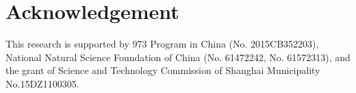 \section*{Acknowledgement}
This research is supported by 973 Program in China (No. 2015CB352203), National Natural Science Foundation of China (No. 61472242, No. 61572313), and the grant of Science and Technology Commission of Shanghai Municipality No.15DZ1100305.